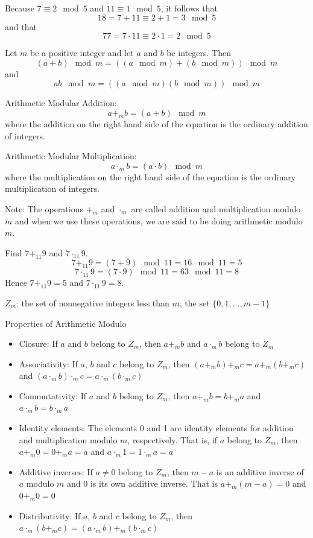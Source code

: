 \documentclass[12pt]{article}
\begin{document}
\begin{example} Because $7 \equiv 2 \mod 5$ and $11 \equiv 1 \mod 5$, it follows that $$18 = 7 + 11 \equiv 2 + 1 = 3 \mod 5 $$ and that $$77 = 7 \cdot 11 \equiv 2 \cdot 1 = 2 \mod 5 $$ \end{example} 
\begin{theorem} Let $m$ be a positive integer and let $a$ and $b$ be integers. Then $$(a + b)\mod m = ((a \mod m) + (b \mod m)) \mod m$$ and $$ ab \mod m = ((a \mod m)(b \mod m)) \mod m$$ \end{theorem} 
\begin{definition} Arithmetic Modular Addition: $$a +_m b = (a + b) \mod m$$ where the addition on the right hand side of the equation is the ordinary addition of integers. \end{definition} 
\begin{definition} Arithmetic Modular Multiplication: $$a \cdot_m b = (a \cdot b)\mod m$$ where the multiplication on the right hand side of the equation is the ordinary multiplication of integers. \end{definition} 
Note: The operations $+_m$ and $\cdot_m$ are called addition and multiplication modulo $m$ and when we use these operations, we are said to be doing arithmetic modulo $m$. 
\begin{example} Find $7 +_{11} 9$ and $7 \cdot_{11} 9$. 
$$7 +_{11} 9 = (7 + 9) \mod 11 = 16 \mod 11 = 5$$ 
$$ 7 \cdot_{11} 9 = (7 \cdot 9) \mod 11 = 63 \mod 11 = 8$$
Hence $7 +_{11} 9 = 5$ and $7 \cdot_{11} 9 = 8$. \end{example} 
\begin{definition} $Z_m$: the set of nonnegative integers less than $m$, the set $\{0, 1, \dots, m - 1\}$ \end{definition} 
Properties of Arithmetic Modulo \begin{itemize} 
\item Closure: If $a$ and $b$ belong to $Z_m$, then $a +_m b$ and $a \cdot_m b$ belong to $Z_m$ 
\item Associativity: If $a$, $b$ and $c$ belong to $Z_m$, then $(a +_m b) +_m c = a +_m (b +_m c)$ and $(a \cdot_m b) \cdot_m c = a \cdot_m (b \cdot_m c) $
\item Commutativity: If $a$ and $b$ belong to $Z_m$, then $a +_m b = b +_m a$ and $a \cdot_m b = b \cdot_m a$ 
\item Identity elements: The elements 0 and 1 are identity elements for addition and multiplication modulo $m$, respectively. That is, if $a$ belong to $Z_m$, then $a +_m 0 = 0 +_m a = a$ and $a \cdot_m 1 = 1 \cdot_m a = a$
\item Additive inverses: If $a \neq 0$ belong to $Z_m$, then $m -a$ is an additive inverse of $a$ modulo $m$ and 0 is its own additive inverse. That is $a +_m (m - a) = 0$ and $0 +_m 0 = 0$ 
\item Distributivity: If $a$, $b$ and $c$ belong to $Z_m$, then $a \cdot_m (b +_m c) = (a \cdot_m b) +_m (b \cdot_m c)$ \end{itemize} 
\end{document}
